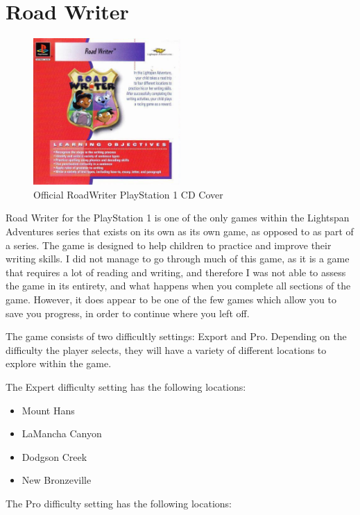 \chapter{Road Writer}

\begin{figure}[H]
    \centering
    \includegraphics[width=0.5\textwidth]{"./Games/RoadWriter/Images/RoadWriterCDCover.jpg"}
    \caption{Official RoadWriter PlayStation 1 CD Cover}
\end{figure}

Road Writer for the PlayStation 1 is one of the only games within the Lightspan Adventures series that exists on its own as its own game, as opposed to as part of a series.
The game is designed to help children to practice and improve their writing skills.
I did not manage to go through much of this game, as it is a game that requires a lot of reading and writing, and therefore I was not able to assess the game in its entirety, and what happens when you complete all sections of the game.
However, it does appear to be one of the few games which allow you to save you progress, in order to continue where you left off.

The game consists of two difficultly settings: Export and Pro.
Depending on the difficulty the player selects, they will have a variety of different locations to explore within the game.

The Expert difficulty setting has the following locations:

\begin{itemize}
    \item Mount Hans
    \item LaMancha Canyon
    \item Dodgson Creek
    \item New Bronzeville
\end{itemize}

The Pro difficulty setting has the following locations:

